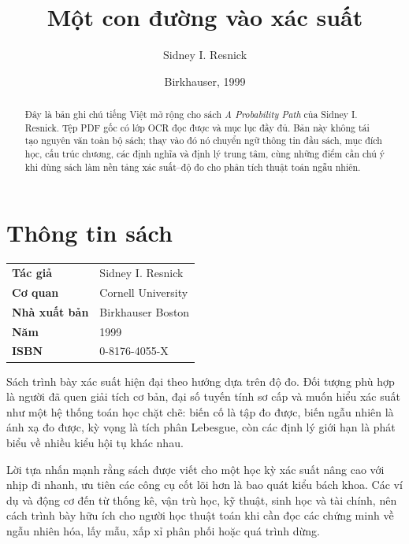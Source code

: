 \documentclass[11pt]{article}
\title{Một con đường vào xác suất}
\author{Sidney I. Resnick}
\date{Birkhauser, 1999}
\begin{document}
\maketitle


\renewcommand{\abstractname}{Tóm tắt}
\begin{abstract}
Đây là bản ghi chú tiếng Việt mở rộng cho sách \emph{A Probability Path} của
Sidney I. Resnick. Tệp PDF gốc có lớp OCR đọc được và mục lục đầy đủ. Bản này
không tái tạo nguyên văn toàn bộ sách; thay vào đó nó chuyển ngữ thông tin đầu
sách, mục đích học, cấu trúc chương, các định nghĩa và định lý trung tâm, cùng
những điểm cần chú ý khi dùng sách làm nền tảng xác suất--độ đo cho phân tích
thuật toán ngẫu nhiên.
\end{abstract}

\section{Thông tin sách}

\begin{center}
\begin{tabular}{ll}
\textbf{Tác giả} & Sidney I. Resnick \\
\textbf{Cơ quan} & Cornell University \\
\textbf{Nhà xuất bản} & Birkhauser Boston \\
\textbf{Năm} & 1999 \\
\textbf{ISBN} & 0-8176-4055-X
\end{tabular}
\end{center}

Sách trình bày xác suất hiện đại theo hướng dựa trên độ đo. Đối tượng phù hợp
là người đã quen giải tích cơ bản, đại số tuyến tính sơ cấp và muốn hiểu xác
suất như một hệ thống toán học chặt chẽ: biến cố là tập đo được, biến ngẫu
nhiên là ánh xạ đo được, kỳ vọng là tích phân Lebesgue, còn các định lý giới
hạn là phát biểu về nhiều kiểu hội tụ khác nhau.

Lời tựa nhấn mạnh rằng sách được viết cho một học kỳ xác suất nâng cao với
nhịp đi nhanh, ưu tiên các công cụ cốt lõi hơn là bao quát kiểu bách khoa.
Các ví dụ và động cơ đến từ thống kê, vận trù học, kỹ thuật, sinh học và tài
chính, nên cách trình bày hữu ích cho người học thuật toán khi cần đọc các
chứng minh về ngẫu nhiên hóa, lấy mẫu, xấp xỉ phân phối hoặc quá trình dừng.
\end{document}
